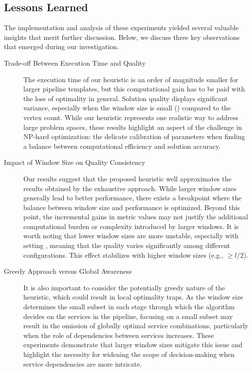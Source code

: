 {\color{OurColor}
\subsection{Lessons Learned}
The implementation and analysis of these experiments yielded several valuable insights that merit further discussion. Below, we discuss three key observations that emerged during our investigation.
\begin{description}
  \item[Trade-off Between Execution Time and Quality] The execution time of our heuristic is an order of magnitude smaller for larger pipeline templates, but this computational gain has to be paid with the loss of optimality in general. Solution quality displays significant variance, especially when the window size is small (\windowsize) compared to the vertex count. While our heuristic represents one realistic way to address large problem spaces, these results highlight an aspect of the challenge in NP-hard optimization: the delicate calibration of parameters when finding a balance between computational efficiency and solution accuracy.
  \item[Impact of Window Size on Quality Consistency] Our results suggest that the proposed heuristic well approximates the results obtained by the exhaustive approach. While larger window sizes generally lead to better performance, there exists a breakpoint where the balance between window size and performance is optimized. Beyond this point, the incremental gains in metric values may not justify the additional computational burden or complexity introduced by larger windows. It is worth noting that lower window sizes are more unstable, especially with setting \wide, meaning that the quality varies significantly among different configurations. This effect stabilizes with higher window sizes (e.g., \windowsize$\geq$$l$/2).
  \item[Greedy Approach versus Global Awareness]  It is also important to consider the potentially greedy nature of the heuristic, which could result in local optimality traps. As the window size determines the small subset in each stage through which the algorithm decides on the services in the pipeline, focusing on a small subset may result in the omission of globally optimal service combinations, particularly when the role of dependencies between services increases. These experiments demonstrate that larger window sizes mitigate this issue and highlight the necessity for widening the scope of decision-making when service dependencies are more intricate.


\end{description}

}



